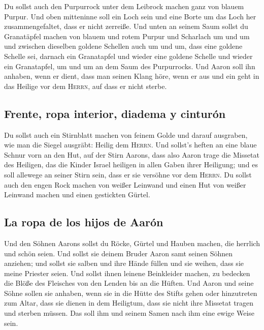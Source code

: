  Du sollst auch den Purpurrock unter dem Leibrock machen
ganz von blauem Purpur.  Und oben mitteninne soll ein
Loch sein und eine Borte um das Loch her zusammengefaltet, dass er nicht
zerreiße.  Und unten an seinem Saum sollst du Granatäpfel
machen von blauem und rotem Purpur und Scharlach um und um und zwischen
dieselben goldene Schellen auch um und um,  dass eine
goldene Schelle sei, darnach ein Granatapfel und wieder eine goldene
Schelle und wieder ein Granatapfel, um und um an dem Saum des
Purpurrocks.  Und Aaron soll ihn anhaben, wenn er dient,
dass man seinen Klang höre, wenn er aus und ein geht in das Heilige vor
dem \textsc{Herrn}, auf dass er nicht sterbe.

\hypertarget{frente-ropa-interior-diadema-y-cinturuxf3n}{%
\subsection{Frente, ropa interior, diadema y
cinturón}\label{frente-ropa-interior-diadema-y-cinturuxf3n}}

 Du sollst auch ein Stirnblatt machen von feinem Golde
und darauf ausgraben, wie man die Siegel ausgräbt: Heilig dem
\textsc{Herrn}.  Und sollst's heften an eine blaue Schnur
vorn an den Hut,  auf der Stirn Aarons, dass also Aaron
trage die Missetat des Heiligen, das die Kinder Israel heiligen in allen
Gaben ihrer Heiligung; und es soll allewege an seiner Stirn sein, dass
er sie versöhne vor dem \textsc{Herrn}.  Du sollst auch
den engen Rock machen von weißer Leinwand und einen Hut von weißer
Leinwand machen und einen gestickten Gürtel.

\hypertarget{la-ropa-de-los-hijos-de-aaruxf3n}{%
\subsection{La ropa de los hijos de
Aarón}\label{la-ropa-de-los-hijos-de-aaruxf3n}}

 Und den Söhnen Aarons sollst du Röcke, Gürtel und Hauben
machen, die herrlich und schön seien.  Und sollst sie
deinem Bruder Aaron samt seinen Söhnen anziehen; und sollst sie salben
und ihre Hände füllen und sie weihen, dass sie meine Priester seien.
 Und sollst ihnen leinene Beinkleider machen, zu bedecken
die Blöße des Fleisches von den Lenden bis an die Hüften.
 Und Aaron und seine Söhne sollen sie anhaben, wenn sie
in die Hütte des Stifts gehen oder hinzutreten zum Altar, dass sie
dienen in dem Heiligtum, dass sie nicht ihre Missetat tragen und sterben
müssen. Das soll ihm und seinem Samen nach ihm eine ewige Weise sein.

